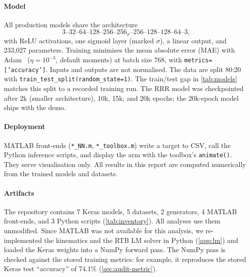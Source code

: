 \documentclass[conference]{IEEEtran}
\newcommand{\code}[1]{\texttt{#1}}
\begin{document}
\paragraph{Model}
All production models share the architecture
\[
3\text{--}32\text{--}64\text{--}128\text{--}256\text{--}256_{\sigma}\text{--}256\text{--}128\text{--}128\text{--}64\text{--}3,
\]
with ReLU activations, one sigmoid layer (marked $\sigma$), a linear output, and 233{,}027 parameters. Training minimises the mean absolute error (MAE) with Adam~\cite{kingma2015adam} ($\eta=10^{-3}$, default moments) at batch size 768, with \code{metrics=['accuracy']}. Inputs and outputs are not normalised. The data are split 80:20 with \code{train\_test\_split(random\_state=1)}. The train/test gap in \cref{tab:models} matches this split to a recorded training run. The RRR model was checkpointed after 2k (smaller architecture), 10k, 15k, and 20k epochs; the 20k-epoch model ships with the demo.

\paragraph{Deployment}
MATLAB front-ends (\code{*\_NN.m}, \code{*\_toolbox.m}) write a target to CSV, call the Python inference scripts, and display the arm with the toolbox's \code{animate()}. They serve visualisation only. All results in this report are computed numerically from the trained models and datasets.

\paragraph{Artifacts}
The repository contains 7 Keras models, 5 datasets, 2 generators, 4 MATLAB front-ends, and 3 Python scripts (\cref{tab:inventory}). All analyses use them unmodified. Since MATLAB was not available for this analysis, we re-implemented the kinematics and the RTB LM solver in Python (\cref{app:lm}) and loaded the Keras weights into a NumPy forward pass. The NumPy pass is checked against the stored training metrics: for example, it reproduces the stored Keras test ``accuracy'' of 74.1\% (\cref{sec:audit-metric}).
\end{document}
